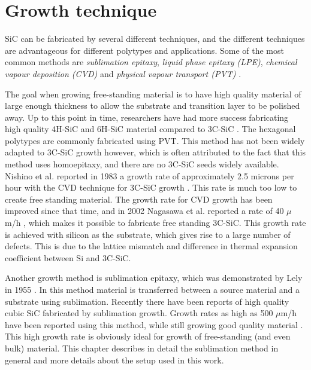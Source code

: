 \chapter{Growth technique}
\label{sec:growth}

	

SiC can be fabricated by several different techniques, and the different techniques are advantageous for different polytypes and applications. Some of the most common methods are \emph{sublimation epitaxy}, \emph{liquid phase epitaxy (LPE)}, \emph{chemical vapour deposition (CVD)} and \emph{physical vapour transport (PVT)} \cite{Ivanov1999}. 

The goal when growing free-standing material is to have high quality material of large enough thickness to allow the substrate and transition layer to be polished away. Up to this point in time, researchers have had more success fabricating high quality 4H-SiC and 6H-SiC material compared to 3C-SiC \cite{J.B.CASADYandR.W.JOHNSON1996}. The hexagonal polytypes are commonly fabricated using PVT. This method has not been widely adapted to 3C-SiC growth however, which is often attributed to the fact that this method uses homoepitaxy, and there are no 3C-SiC seeds widely available. Nishino et al. reported in 1983 a growth rate of approximately 2.5 microns per hour with the CVD technique for 3C-SiC growth \cite{Nishino1983}. This rate is much too low to create free standing material. The growth rate for CVD growth has been improved since that time, and in 2002 Nagasawa et al. reported a rate of 40 $\mu$m/h \cite{Nagasawa2002}, which makes it possible to fabricate free standing 3C-SiC. This growth rate is achieved with silicon as the substrate, which gives rise to a large number of defects. This is due to the lattice mismatch and difference in thermal expansion coefficient between Si and 3C-SiC. 

Another growth method is sublimation epitaxy, which was demonstrated by Lely in 1955 \cite{Lely1955}. In this method material is transferred between a source material and a substrate using sublimation. Recently there have been reports of high quality cubic SiC fabricated by sublimation growth. Growth rates as high as 500 $\mu$m/h have been reported using this method, while still growing good quality material \cite{Jokubavicius2014}. This high growth rate is obviously ideal for growth of free-standing (and even bulk) material. This chapter describes in detail the sublimation method in general and more details about the setup used in this work. 
 

